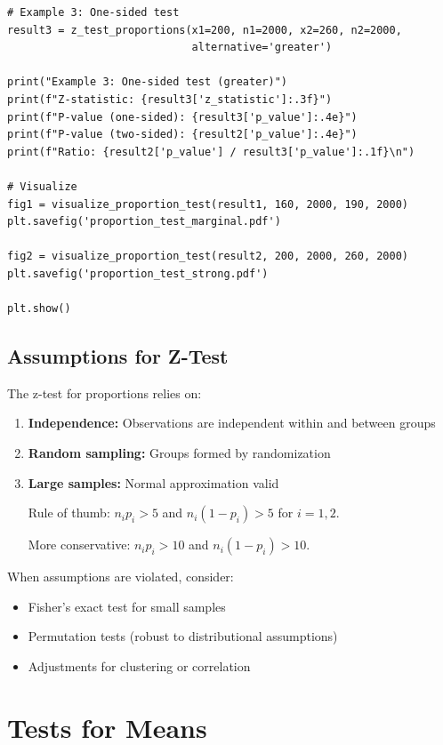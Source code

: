 \begin{lstlisting}
# Example 3: One-sided test
result3 = z_test_proportions(x1=200, n1=2000, x2=260, n2=2000,
                             alternative='greater')

print("Example 3: One-sided test (greater)")
print(f"Z-statistic: {result3['z_statistic']:.3f}")
print(f"P-value (one-sided): {result3['p_value']:.4e}")
print(f"P-value (two-sided): {result2['p_value']:.4e}")
print(f"Ratio: {result2['p_value'] / result3['p_value']:.1f}\n")

# Visualize
fig1 = visualize_proportion_test(result1, 160, 2000, 190, 2000)
plt.savefig('proportion_test_marginal.pdf')

fig2 = visualize_proportion_test(result2, 200, 2000, 260, 2000)
plt.savefig('proportion_test_strong.pdf')

plt.show()
\end{lstlisting}

\subsection{Assumptions for Z-Test}

The z-test for proportions relies on:

\begin{enumerate}
    \item \textbf{Independence:} Observations are independent within and between groups

    \item \textbf{Random sampling:} Groups formed by randomization

    \item \textbf{Large samples:} Normal approximation valid

    Rule of thumb: $n_i p_i > 5$ and $n_i(1-p_i) > 5$ for $i = 1, 2$.

    More conservative: $n_i p_i > 10$ and $n_i(1-p_i) > 10$.
\end{enumerate}

When assumptions are violated, consider:
\begin{itemize}
    \item Fisher's exact test for small samples
    \item Permutation tests (robust to distributional assumptions)
    \item Adjustments for clustering or correlation
\end{itemize}

\section{Tests for Means}

